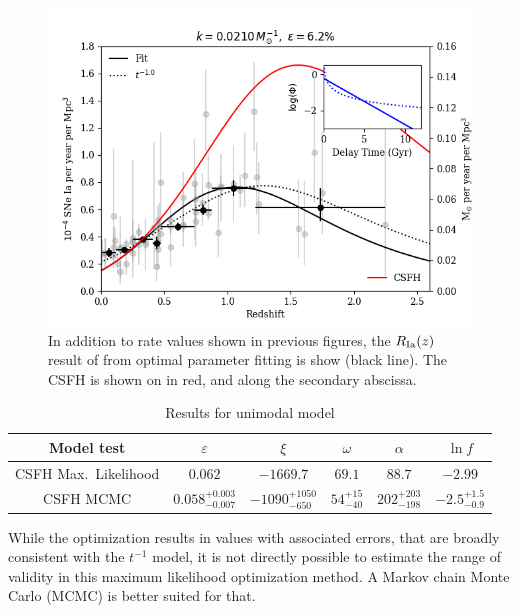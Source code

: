 \documentclass[apj]{aastex62}
\begin{document}
\begin{figure}[t] %
   \centering
   \includegraphics[width=6.5in]{figure_sfd_optimized} 
   \caption{\footnotesize In addition to rate values shown in previous figures, the $R_{\rm Ia}(z)$ result of from optimal parameter fitting is show (black line). The CSFH is shown on in red, and along the secondary abscissa. }
   \label{fig:sfd_optimized_curvefit}
\end{figure}

\begin{table}
    \centering
    \caption{Results for unimodal model}
    \label{tab:results}
    \begin{tabular}{cccccc}
        \hline
                Model test & $\varepsilon$ & $\xi$ & $\omega$ & $\alpha$ & $\ln f$ \\ 
                \hline
		CSFH Max.~Likelihood &$0.062$&$-1669.7$& $69.1$& $88.7$& $-2.99$\\
                CSFH MCMC & $0.058^{+0.003}_{-0.007}$ & $-1090^{+1050}_{-650}$ &$54^{+15}_{-40}$& $202^{+203}_{-198}$&  $-2.5^{+1.5}_{-0.9}$\\
                \hline
    \end{tabular}
\end{table}

While the optimization results in values with associated errors, that are broadly consistent with the $t^{-1}$ model, it is not directly possible to estimate the range of validity in this maximum likelihood optimization method. A Markov chain Monte Carlo (MCMC) is better suited for that.
\end{document}
